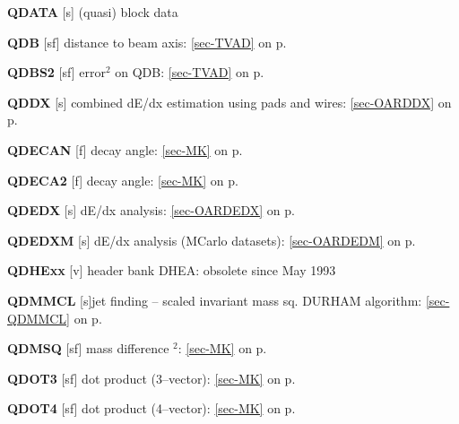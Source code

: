  \item{\bf QDATA   }[s] (quasi) block data\\
 \item{\bf QDB     }[sf] distance to beam axis: \ref{sec-TVAD} on p.~\pageref{sec-TVAD}\\
 \item{\bf QDBS2   }[sf] error$^2$ on QDB: \ref{sec-TVAD} on p.~\pageref{sec-TVAD}\\
 \item{\bf QDDX    }[s] combined dE/dx estimation using pads and wires: \ref{sec-OARDDX} on p.~\pageref{sec-OARDDX}\\
 \item{\bf QDECAN  }[f] decay angle: \ref{sec-MK} on p.~\pageref{sec-MK}\\
 \item{\bf QDECA2  }[f] decay angle: \ref{sec-MK} on p.~\pageref{sec-MK}\\
 \item{\bf QDEDX   }[s] dE/dx analysis: \ref{sec-OARDEDX} on
 p.~\pageref{sec-OARDEDX}\\
 \item{\bf QDEDXM  }[s] dE/dx analysis (MCarlo datasets): \ref{sec-OARDEDM} on
 p.~\pageref{sec-OARDEDM}\\
 \item{\bf QDHExx  }[v] header bank DHEA: obsolete since May 1993\\
 \item{\bf QDMMCL  }[s]jet finding -- scaled invariant mass sq. DURHAM algorithm:
 \ref{sec-QDMMCL} on p.~\pageref{sec-QDMMCL}\\
 \item{\bf QDMSQ   }[sf] mass difference $^2$: \ref{sec-MK} on p.~\pageref{sec-MK}\\
 \item{\bf QDOT3   }[sf] dot product (3--vector): \ref{sec-MK} on p.~\pageref{sec-MK}\\
 \item{\bf QDOT4   }[sf] dot product (4--vector): \ref{sec-MK} on p.~\pageref{sec-MK}
 
